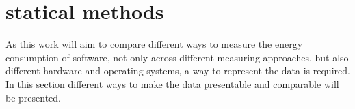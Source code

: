 \section{statical methods}\label{sec:stat}

As this work will aim to compare different ways to measure the energy consumption of software, not only across different measuring approaches, but also different hardware and operating systems, a way to represent the data is required. In this section different ways to make the data presentable and comparable will be presented.










